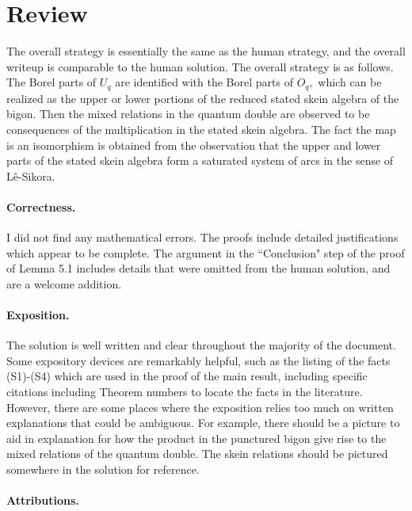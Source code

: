 \documentclass[11pt]{article}
\theoremstyle{remark}
\begin{document}
\maketitle

\section{Review}

The overall strategy is essentially the same as the human strategy, and the overall writeup is comparable to the human solution. The overall strategy is as follows. The Borel parts of $U_q$ are identified with the Borel parts of $O_q,$ which can be realized as the upper or lower portions of the reduced stated skein algebra of the bigon. Then the mixed relations in the quantum double are observed to be consequences of the multiplication in the stated skein algebra. The fact the map is an isomorphism is obtained from the observation that the upper and lower parts of the stated skein algebra form a saturated system of arcs in the sense of L\^{e}-Sikora.

\paragraph{Correctness.} I did not find any mathematical errors. The proofs include detailed justifications which appear to be complete. The argument in the ``Conclusion" step of the proof of Lemma 5.1 includes details that were omitted from the human solution, and are a welcome addition.

\paragraph{Exposition.}
The solution is well written and clear throughout the majority of the document. Some expository devices are remarkably helpful, such as the listing of the facts (S1)-(S4) which are used in the proof of the main result, including specific citations including Theorem numbers to locate the facts in the literature. However, there are some places where the exposition relies too much on written explanations that could be ambiguous. For example, there should be a picture to aid in explanation for how the product in the punctured bigon give rise to the mixed relations of the quantum double. The skein relations should be pictured somewhere in the solution for reference.

\paragraph{Attributions.}
\end{document}
